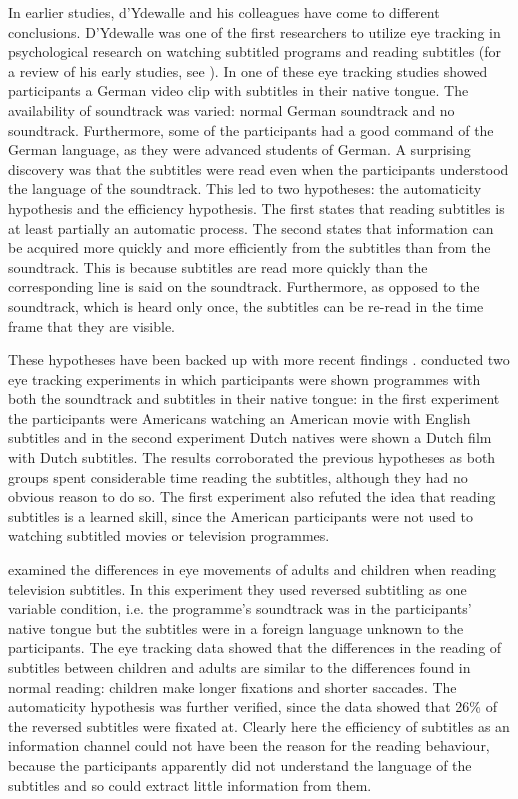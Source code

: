 \documentclass[output=paper]{langsci/langscibook}
\begin{document}
In earlier studies, d’Ydewalle and his colleagues have come to different conclusions. D’Ydewalle was one of the first researchers to utilize eye tracking in psychological research on watching subtitled programs and reading subtitles (for a review of his early studies, see \citet{dydewalle1992}). In one of these eye tracking studies \citet{dydewalle1987} showed participants a German video clip with subtitles in their native tongue. The availability of soundtrack was varied: normal German soundtrack and no soundtrack. Furthermore, some of the participants had a good command of the German language, as they were advanced students of German. A surprising discovery was that the subtitles were read even when the participants understood the language of the soundtrack. This led to two hypotheses: the automaticity hypothesis and the efficiency hypothesis. The first states that reading subtitles is at least partially an automatic process. The second states that information can be acquired more quickly and more efficiently from the subtitles than from the soundtrack. This is because subtitles are read more quickly than the corresponding line is said on the soundtrack. Furthermore, as opposed to the soundtrack, which is heard only once, the subtitles can be re-read in the time frame that they are visible. 

These hypotheses have been backed up with more recent findings \citep{dydewalle1991, Bruycker2007, Perego2010, Perego2015}. \citet{dydewalle1991} conducted two eye tracking experiments in which participants were shown programmes with both the soundtrack and subtitles in their native tongue: in the first experiment the participants were Americans watching an American movie with English subtitles and in the second experiment Dutch natives were shown a Dutch film with Dutch subtitles. The results corroborated the previous hypotheses as both groups spent considerable time reading the subtitles, although they had no obvious reason to do so. The first experiment also refuted the idea that reading subtitles is a learned skill, since the American participants were not used to watching subtitled movies or television programmes.

\citet{Bruycker2007} examined the differences in eye movements of adults and children when reading television subtitles. In this experiment they used reversed subtitling as one variable condition, i.e. the programme’s soundtrack was in the participants’ native tongue but the subtitles were in a foreign language unknown to the participants. The eye tracking data showed that the differences in the reading of subtitles between children and adults are similar to the differences found in normal reading: children make longer fixations and shorter saccades. The automaticity hypothesis was further verified, since the data showed that 26\% of the reversed subtitles were fixated at. Clearly here the efficiency of subtitles as an information channel could not have been the reason for the reading behaviour, because the participants apparently did not understand the language of the subtitles and so could extract little information from them. 
\end{document}
